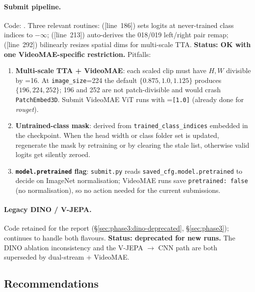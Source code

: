 \paragraph{Submit pipeline.}  Code:
.  Three relevant routines:
 ([line~186]) sets logits at never-trained
class indices to \(-\infty\); 
([line~213]) auto-derives the 018/019 left/right pair remap;
 ([line~292]) bilinearly resizes spatial dims for
multi-scale TTA.  \textbf{Status: OK with one VideoMAE-specific
restriction.}  Pitfalls:
\begin{enumerate}[leftmargin=*]
\item \textbf{Multi-scale TTA + VideoMAE}: each scaled clip must have
   \(H, W\) divisible by =16.  At
   \texttt{image\_size}=224 the default
   \(\{0.875, 1.0, 1.125\}\) produces \(\{196, 224, 252\}\); 196 and 252
   are not patch-divisible and would crash \texttt{PatchEmbed3D}.  Submit
   VideoMAE ViT runs with =\texttt{[1.0]}
   (already done for \emph{rouget}).
\item \textbf{Untrained-class mask}: derived from
   \texttt{trained\_class\_indices} embedded in the checkpoint.  When
   the head width or class folder set is updated, regenerate the mask by
   retraining or by clearing the stale list, otherwise valid logits get
   silently zeroed.
\item \textbf{\texttt{model.pretrained} flag}: \texttt{submit.py} reads
   \texttt{saved\_cfg.model.pretrained} to decide on ImageNet normalisation;
   VideoMAE runs save \texttt{pretrained: false} (no normalisation), so
   no action needed for the current submissions.
\end{enumerate}

\paragraph{Legacy DINO / V-JEPA.}  Code retained for the report
(\S\ref{sec:phase3:dino-deprecated}, \S\ref{sec:phase3});
 continues to handle both
flavours.  \textbf{Status: deprecated for new runs.}  The DINO ablation
inconsistency and the V-JEPA $\to$ CNN path are both superseded by
dual-stream + VideoMAE.

\subsection{Recommendations}
\label{sec:tracka:inventory:recs}

